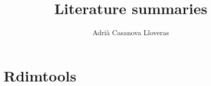 \documentclass[a4paper,12pt]{article}
\title{Literature summaries}
\author{Adrià Casanova Lloveras}
\begin{document}
\maketitle

\tableofcontents
\pagebreak

\section{Rdimtools \cite{Rdimtools}}


\pagebreak
\printbibliography
\end{document}
